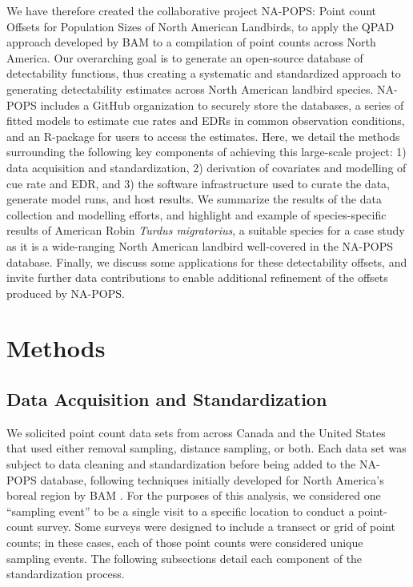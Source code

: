 We have therefore created the collaborative project NA-POPS: Point count Offsets for Population Sizes of North American Landbirds, to apply the QPAD approach developed by BAM to a compilation of point counts across North America. Our overarching goal is to generate an open-source database of detectability functions, thus creating a systematic and standardized approach to generating detectability estimates across North American landbird species. NA-POPS includes a GitHub organization \citep{blischak_quick_2016, crystal-ornelas_not_2022} to securely store the databases, a series of fitted models to estimate cue rates and EDRs in common observation conditions, and an R-package for users to access the estimates. Here, we detail the methods surrounding the following key components of achieving this large-scale project: 1) data acquisition and standardization, 2) derivation of covariates and modelling of cue rate and EDR, and 3) the software infrastructure used to curate the data, generate model runs, and host results. We summarize the results of the data collection and modelling efforts, and highlight and example of species-specific results of American Robin \textit{Turdus migratorius}, a suitable species for a case study as it is a wide-ranging North American landbird well-covered in the NA-POPS database. Finally, we discuss some applications for these detectability offsets, and invite further data contributions to enable additional refinement of the offsets produced by NA-POPS.

\section{Methods}
\subsection{Data Acquisition and Standardization}
We solicited point count data sets from across Canada and the United States that used either removal sampling, distance sampling, or both. Each data set was subject to data cleaning and standardization before being added to the NA-POPS database, following techniques initially developed for North America’s boreal region by BAM \citep{cumming_toward_2010, barker_ecological_2015}. For the purposes of this analysis, we considered one “sampling event” to be a single visit to a specific location to conduct a point-count survey. Some surveys were designed to include a transect or grid of point counts; in these cases, each of those point counts were considered unique sampling events. The following subsections detail each component of the standardization process.

